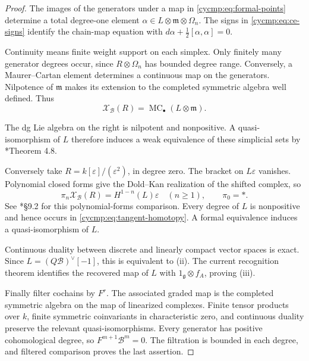 \begin{proof}
The images of the generators under a map in
\eqref{cycmp:eq:formal-points} determine a total degree-one element
$\alpha\in L\otimes\mathfrak m\otimes\Omega_n$.
The signs in \eqref{cycmp:eq:ce-signs} identify the chain-map equation
with $d\alpha+\tfrac12[\alpha,\alpha]=0$.

Continuity means finite weight support on each simplex. Only finitely
many generator degrees occur, since $R\otimes\Omega_n$ has bounded
degree range. Conversely, a Maurer--Cartan element determines a
continuous map on the generators. Nilpotence of $\mathfrak m$ makes
its extension to the completed symmetric algebra well defined.
Thus
\[
 \mathcal X_{\mathcal B}(R)=
 \operatorname{MC}_\bullet(L\otimes\mathfrak m).
\]

The dg Lie algebra on the right is nilpotent and nonpositive.
A quasi-isomorphism of $L$ therefore induces a weak equivalence
of these simplicial sets by \cite{cycmp:Getzler}*{Theorem 4.8}.

Conversely take $R=k[\varepsilon]/(\varepsilon^2)$, in degree zero.
The bracket on $L\varepsilon$ vanishes. Polynomial closed forms
give the Dold--Kan realization of the shifted complex, so
\begin{equation}\label{cycmp:eq:tangent-homotopy}
 \pi_n\mathcal X_{\mathcal B}(R)
       =H^{1-n}(L)\varepsilon\quad(n\ge1),\qquad \pi_0=*.
\end{equation}
See \cite{cycmp:Hinich}*{\S9.2} for this polynomial-forms comparison.
Every degree of $L$ is nonpositive and hence occurs in
\eqref{cycmp:eq:tangent-homotopy}. A formal equivalence induces a
quasi-isomorphism of $L$.

Continuous duality between discrete and linearly compact vector
spaces is exact. Since $L=(Q\mathcal B)^\vee[-1]$, this is equivalent
to (ii). The current recognition theorem identifies the recovered
map of $L$ with $1_{\mathfrak g}\otimes f_A$, proving (iii).

Finally filter cochains by $F^r$. The associated graded map is the
completed symmetric algebra on the map of linearized complexes.
Finite tensor products over $k$, finite symmetric coinvariants in
characteristic zero, and continuous duality preserve the relevant
quasi-isomorphisms. Every generator has positive cohomological degree,
so $F^{m+1}\mathcal B^m=0$. The filtration is bounded in each
degree, and filtered comparison proves the last assertion.
\end{proof}

